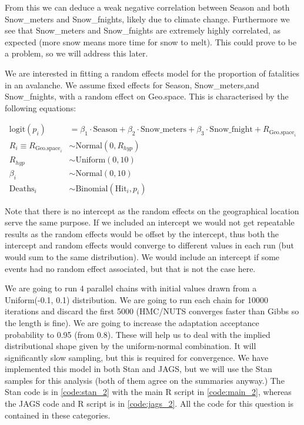 \documentclass[10pt]{extarticle}
\begin{document}
From this we can deduce a weak negative correlation between Season and both Snow\_meters and Snow\_fnights, likely due to climate change. Furthermore we see that Snow\_meters and Snow\_fnights are extremely highly correlated, as expected (more snow means more time for snow to melt). This could prove to be a problem, so we will address this later. 

We are interested in fitting a random effects model for the proportion of fatalities in an avalanche. We assume fixed effects for Season, Snow\_meters,and Snow\_fnights, with a random effect on Geo.space. This is characterised by the following equations:

\begin{align*}
\mathrm{logit}(p_i) &= \beta_1 \cdot \mathrm{Season} + \beta_2 \cdot \mathrm{Snow\_meters} + \beta_3 \cdot \mathrm{Snow\_fnight} + R_{\mathrm{Geo.space}_i}\\
R_i \equiv R_{\mathrm{Geo.space}_i} &\sim \mathrm{Normal}(0, R_{hyp})\\
R_{hyp} &\sim \mathrm{Uniform}(0, 10)\\
\beta_i &\sim \mathrm{Normal}(0, 10)\\
\mathrm{Deaths}_i &\sim \mathrm{Binomial}(\mathrm{Hit}_i, p_i)
\end{align*}

Note that there is no intercept as the random effects on the geographical location serve the same purpose. If we included an intercept we would not get repeatable results as the random effects would be offset by the intercept, thus both the intercept and random effects would converge to different values in each run (but would sum to the same distribution). We would include an intercept if some events had no random effect associated, but that is not the case here.

We are going to run $4$ parallel chains with initial values drawn from a Uniform(-0.1, 0.1) distribution. We are going to run each chain for 10000 iterations and discard the first 5000 (HMC/NUTS converges faster than Gibbs so the length is fine). We are going to increase the adaptation acceptance probability to 0.95 (from 0.8). These will help us to deal with the implied distributional shape given by the uniform-normal combination. It will significantly slow sampling, but this is required for convergence. We have implemented this model in both Stan and JAGS, but we will use the Stan samples for this analysis (both of them agree on the summaries anyway.) The Stan code is in \ref{code:stan_2} with the main R script in \ref{code:main_2}, whereas the JAGS code and R script is in \ref{code:jags_2}. All the code for this question is contained in these categories.
\end{document}
